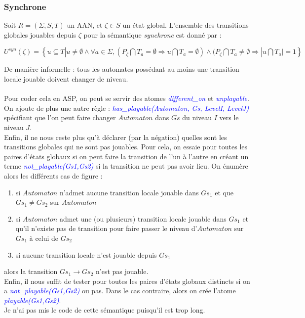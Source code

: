 \documentclass[10pt,a4paper]{article}
\begin{document}
\subsubsection{Synchrone}
Soit $R = (\Sigma,S,T)$ un AAN, et $\zeta\in S$ un état global. L'ensemble des transitions globales jouables depuis $\zeta$ pour la sémantique \emph{synchrone} est donné par :
\begin{center}
	$U^{syn}(\zeta)=\left\{u\subseteq T|u \neq \emptyset \wedge \forall a\in\Sigma,(P_{\zeta}\bigcap T_a = \emptyset \Rightarrow u\bigcap 
	T_a=\emptyset)\wedge(P_{\zeta}\bigcap T_a\neq\emptyset\Rightarrow |u\bigcap T_a |=1\right\}$
\end{center}
De manière informelle : tous les automates possédant au moins une transition locale jouable doivent changer de niveau.\\ \\
Pour coder cela en ASP, on peut se servir des atomes \emph{\textcolor{blue}{different\_on}} et \emph{\textcolor{blue}{unplayable}}.\\
On ajoute de plus une autre règle : \emph{\textcolor{blue}{has\_playable(Automaton, Gs, LevelI, LevelJ)}} spécifiant que l'on peut faire changer $Automaton$ dans $Gs$ du niveau $I$ vers le niveau $J$.\\
Enfin, il ne nous reste plus qu'à déclarer (par la négation) quelles sont les transitions globales qui ne sont pas jouables. Pour cela, on essaie pour toutes les paires d'états globaux si on peut faire la transition de l'un à 
l'autre en créant un terme \emph{\textcolor{blue}{not\_playable(Gs1,Gs2)}} si la transition ne peut pas avoir lieu. On énumère alors les différents cas de figure :
\begin{enumerate}
	\item si $Automaton$ n'admet aucune transition locale jouable dans $Gs_1$ et que $Gs_1\neq Gs_2$ sur $Automaton$
	\item si $Automaton$ admet une (ou plusieurs) transition locale jouable dans $Gs_1$ et qu'il n'existe pas de transition pour faire passer le niveau d'$Automaton$ sur $Gs_1$ à celui de $Gs_2$
	\item si aucune transition locale n'est jouable depuis $Gs_1$
\end{enumerate}
alors la transition $Gs_1\rightarrow Gs_2$ n'est pas jouable.\\
Enfin, il nous suffit de tester pour toutes les paires d'états globaux distincts si on a \emph{\textcolor{blue}{not\_playable(Gs1,Gs2)}} ou pas. Dans le cas contraire, alors on crée l'atome 
\emph{\textcolor{blue}{playable(Gs1,Gs2)}}.\\
Je n'ai pas mis le code de cette sémantique puisqu'il est trop long.
\end{document}
